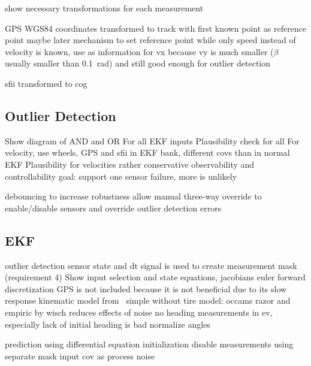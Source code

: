 show necessary transformations for each measurement

GPS WGS84 coordinates transformed to track with first known point as reference point
maybe later mechanism to set reference point
while only speed instead of velocity is known, use as information for vx
because vy is much smaller ($\beta$ usually smaller than \SI{0.1}{\radian}) and still good enough for outlier detection

sfii transformed to \gls{cog}

\subsection{Outlier Detection}
Show diagram of AND and OR
For all EKF inputs
Plausibility check for all
For velocity, use wheels, GPS and sfii in EKF bank, different covs than in normal EKF
Plausibility for velocities rather conservative
observability and controllability
goal: support one sensor failure, more is unlikely

debouncing to increase robustness
allow manual three-way override to enable/disable sensors and override outlier detection errors

\subsection{EKF}
outlier detection sensor state and dt signal is used to create measurement mask (requirement 4)
Show input selection and state equations, jacobians
euler forward discretization
GPS is not included because it is not beneficial due to its slow response
kinematic model from~\cite[p.~156]{AlexanderWischnewski.2019}
simple without tire model: occams razor and empiric by wisch
reduces effects of noise
no heading measurements in ev, especially lack of initial heading is bad
normalize angles

prediction using differential equation
initialization
disable measurements using separate mask
input cov as process noise
